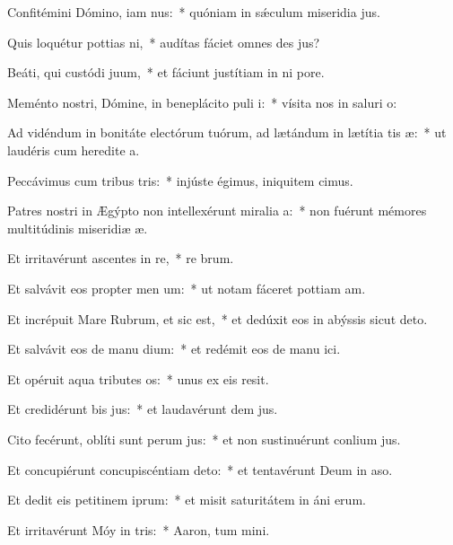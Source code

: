 \item Confitémini Dómino, iam nus:~* quóniam in sǽculum miseridia jus.
\item Quis loquétur pottias ni,~* audítas fáciet omnes des jus?
\item Beáti, qui custódi juum,~* et fáciunt justítiam in ni pore.
\item Meménto nostri, Dómine, in beneplácito puli i:~* vísita nos in saluri o:
\item Ad vidéndum in bonitáte electórum tuórum, ad lætándum in lætítia tis æ:~* ut laudéris cum heredite a.
\item Peccávimus cum tribus tris:~* injúste égimus, iniquitem cimus.
\item Patres nostri in Ægýpto non intellexérunt miralia a:~* non fuérunt mémores multitúdinis miseridiæ æ.
\item Et irritavérunt ascentes in re,~* re brum.
\item Et salvávit eos propter men um:~* ut notam fáceret pottiam am.
\item Et incrépuit Mare Rubrum, et sic est,~* et dedúxit eos in abýssis sicut  deto.
\item Et salvávit eos de manu dium:~* et redémit eos de manu ici.
\item Et opéruit aqua tributes os:~* unus ex eis  resit.
\item Et credidérunt bis jus:~* et laudavérunt dem jus.
\item Cito fecérunt, oblíti sunt perum jus:~* et non sustinuérunt conlium jus.
\item Et concupiérunt concupiscéntiam  deto:~* et tentavérunt Deum in aso.
\item Et dedit eis petitinem iprum:~* et misit saturitátem in áni erum.
\item Et irritavérunt Móy in tris:~* Aaron, tum mini.
